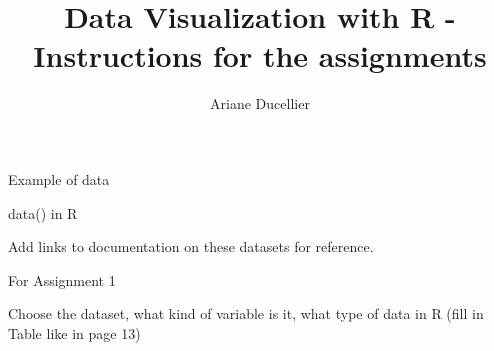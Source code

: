 \documentclass{beamer}
\title[Instructions for the assignments]{Data Visualization with R - Instructions for the assignments}
\author{Ariane Ducellier}
\begin{document}
	\begin{frame}
		\titlepage
	\end{frame}

	\begin{frame}


Example of data

data() in R

Add links to documentation on these datasets for reference.



For Assignment 1

Choose the dataset, what kind of variable is it, what type of data in R (fill in Table like in page 13)

	\end{frame}
\end{document}
